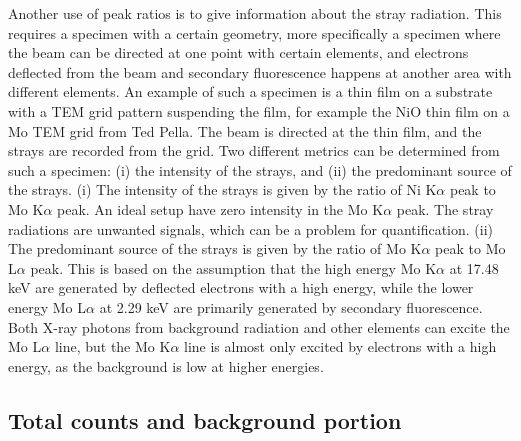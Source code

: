Another use of peak ratios is to give information about the stray radiation.
This requires a specimen with a certain geometry, more specifically a specimen where the beam can be directed at one point with certain elements, and electrons deflected from the beam and secondary fluorescence happens at another area with different elements.
An example of such a specimen is a thin film on a substrate with a TEM grid pattern suspending the film, for example the NiO thin film on a Mo TEM grid from Ted Pella.
The beam is directed at the thin film, and the strays are recorded from the grid.
Two different metrics can be determined from such a specimen: (i) the intensity of the strays, and (ii) the predominant source of the strays.
(i) The intensity of the strays is given by the ratio of Ni K$\alpha$ peak to Mo K$\alpha$ peak.
An ideal setup have zero intensity in the Mo K$\alpha$ peak.
The stray radiations are unwanted signals, which can be a problem for quantification.
(ii) The predominant source of the strays is given by the ratio of Mo K$\alpha$ peak to Mo L$\alpha$ peak.
This is based on the assumption that the high energy Mo K$\alpha$ at 17.48 keV are generated by deflected electrons with a high energy, while the lower energy Mo L$\alpha$ at 2.29 keV are primarily generated by secondary fluorescence.
Both X-ray photons from background radiation and other elements can excite the Mo L$\alpha$ line, but the Mo K$\alpha$ line is almost only excited by electrons with a high energy, as the background is low at higher energies.






\subsection{Total counts and background portion}
\label{theory:eds_performance:background_portion}


